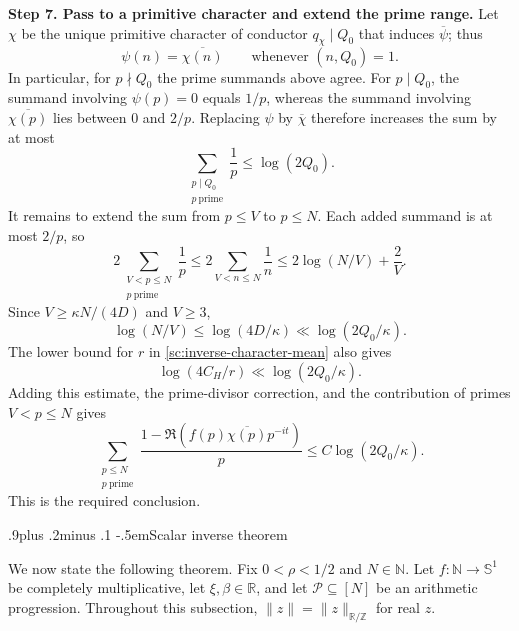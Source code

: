 \documentclass[twoside]{aomart}
\makeatletter
\theoremstyle{paperplain}
\theoremstyle{paperdefinition}
\renewcommand\subsection{\@startsection{subsection}{2}{\z@}
  {.9\baselineskip plus .2\baselineskip minus .1\baselineskip}
  {-.5em}{\normalfont\bfseries}}
\renewenvironment{proof}[1][\proofname]{\par\pushQED{\qed}%
  \normalfont\topsep6\p@\@plus3\p@\relax\trivlist
  \item[\hskip\labelsep\itshape #1\@addpunct{.}]\ignorespaces
}{\popQED\endtrivlist\@endpefalse}
\newcommand{\N}{\mathbb N}
\numberwithin{equation}{section}
\makeatother
\begin{document}
\begin{proof}
\par
\medskip
\noindent\textbf{Step 7. Pass to a primitive character and extend the prime range.}
Let $\chi$ be the unique primitive character of conductor $q_\chi\mid Q_0$
that induces $\overline\psi$; thus
\[
 \psi(n)=\overline{\chi(n)}\qquad\text{whenever }(n,Q_0)=1.
\]
In particular, for $p\nmid Q_0$ the prime summands above agree.
For $p\mid Q_0$, the summand involving $\psi(p)=0$ equals $1/p$,
whereas the summand involving $\overline{\chi(p)}$ lies between
$0$ and $2/p$. Replacing $\psi$ by $\overline\chi$ therefore increases
the sum by at most
\[
 \sum_{\substack{p\mid Q_0\\p\ \mathrm{prime}}}\frac1p\le\log(2Q_0).
\]
It remains to extend the sum from $p\le V$ to $p\le N$. Each added
summand is at most $2/p$, so
\[
 2\sum_{\substack{V<p\le N\\p\ \mathrm{prime}}}\frac1p
 \le2\sum_{V<n\le N}\frac1n
 \le2\log(N/V)+\frac2V.
\]
Since $V\ge\kappa N/(4D)$ and $V\ge3$,
\[
 \log(N/V)\le\log(4D/\kappa)
 \ll\log(2Q_0/\kappa).
\]
The lower bound for $r$ in \eqref{sc:inverse-character-mean} also gives
\[
 \log(4C_H/r)\ll\log(2Q_0/\kappa).
\]
Adding this estimate, the prime-divisor correction, and the contribution
of primes $V<p\le N$ gives
\[
 \sum_{\substack{p\le N\\p\ \mathrm{prime}}}\frac{1-\Re(f(p)\overline{\chi(p)}p^{-it})}{p}
 \le C\log(2Q_0/\kappa).
\]
This is the required conclusion.
\end{proof}

\subsection{Scalar inverse theorem}

We now state the following theorem. Fix $0<\rho<1/2$ and $N\in\N$.
Let $f:\N\to\mathbb S^1$ be completely multiplicative,
let $\xi,\beta\in\mathbb R$, and let
$\mathcal P\subseteq[N]$ be an arithmetic progression.
Throughout this subsection, $\|z\|=\|z\|_{\mathbb R/\mathbb Z}$
for real $z$.
\end{document}

